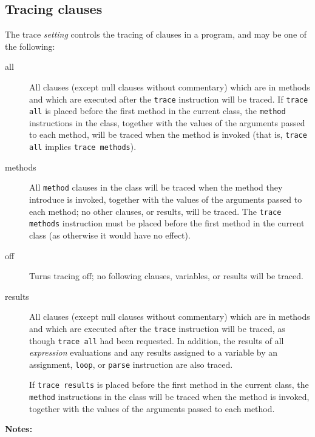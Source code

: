 \subsection{Tracing clauses}
 
The trace \emph{setting} controls the tracing of clauses in a program, and
may be one of the following:
\begin{description}
\item[all]\label{reftrall}
 All clauses (except null clauses without commentary) which are in
methods and which are executed after the \texttt{trace} instruction will
be traced.
If \texttt{trace all} is placed before the first method in the current
class, the \texttt{method} instructions in the class,
together with the values of the arguments passed to each method,
will be traced when the method is invoked (that is, \texttt{trace all}
implies \texttt{trace methods}).
\item[methods]\label{reftrmeth}
 
All \texttt{method} clauses in the class will be traced when the method
they introduce is invoked, together with the values of the arguments
passed to each method; no other clauses, or results, will be traced.
The \texttt{trace methods} instruction must be placed before the first
method in the current class (as otherwise it would have no effect).
\item[off]\label{reftroff}
 
Turns tracing off; no following clauses, variables, or results will be traced.
\item[results]\label{reftrres}
 All clauses (except null clauses without commentary) which are in
methods and which are executed after the \texttt{trace} instruction will
be traced, as though \texttt{trace all} had been requested.
In addition, the results of all \emph{expression} evaluations and
any results assigned to a variable by an assignment, \texttt{loop}, or
\texttt{parse} instruction are also traced.
 
If \texttt{trace results} is placed before the first method in the
current class, the \texttt{method} instructions in the class will be
traced when the method is invoked, together with the values of the
arguments passed to each method.
\end{description}
 \textbf{Notes:}
